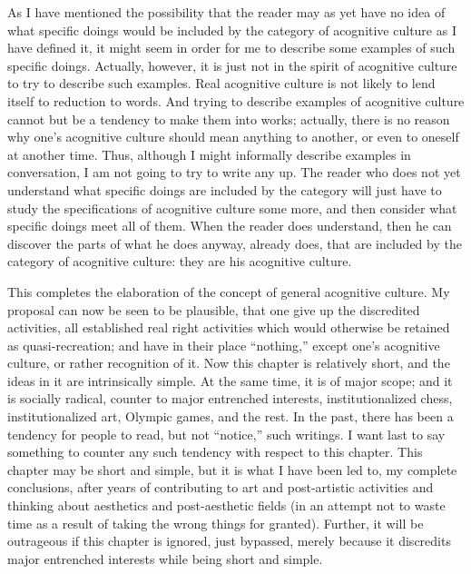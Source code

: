As I have mentioned the possibility that the reader may as yet have no idea of what specific doings would be included by the category of acognitive culture as I have defined it, it might seem in order for me to describe some examples of such specific doings. Actually, however, it is just not in the spirit of acognitive culture to try to describe such examples. Real acognitive culture is not likely to lend itself to reduction to words. And trying to describe examples of acognitive culture cannot but be a tendency to make them into works; actually, there is no reason why one's acognitive culture should mean anything to another, or even to oneself at another time. Thus, although I might informally describe examples in conversation, I am not going to try to write any up. The reader who does not yet understand what specific doings are included by the category will just have to study the specifications of acognitive culture some more, and then consider what specific doings meet all of them. When the reader does understand, then he can discover the parts of what he does anyway, already does, that are included by the category of acognitive culture: they are his acognitive culture.

This completes the elaboration of the concept of general acognitive culture. My proposal can now be seen to be plausible, that one give up the discredited activities, all established real right activities which would otherwise be retained as quasi-recreation; and have in their place \enquote{nothing,} except one's acognitive culture, or rather recognition of it. Now this chapter is relatively short, and the ideas in it are intrinsically simple. At the same time, it is of major scope; and it is socially radical, counter to major entrenched interests, institutionalized chess, institutionalized art, Olympic games, and the rest. In the past, there has been a tendency for people to read, but not \enquote{notice,} such writings. I want last to say something to counter any such tendency with respect to this chapter. This chapter may be short and simple, but it is what I have been led to, my complete conclusions, after years of contributing to art and post-artistic activities and thinking about aesthetics and post-aesthetic fields (in an attempt not to waste time as a result of taking the wrong things for granted). Further, it will be outrageous if this chapter is ignored, just bypassed, merely because it discredits major entrenched interests while being short and simple.

